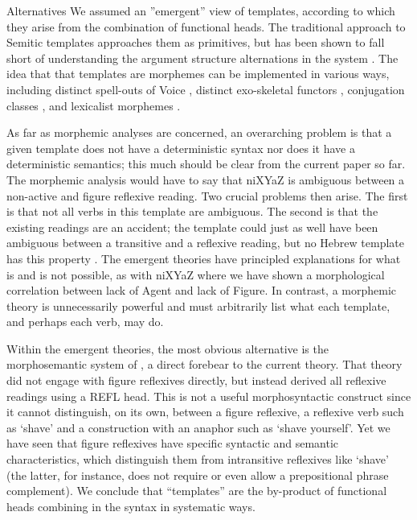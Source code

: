 Alternatives
We assumed an ''emergent'' view of templates, according to which they arise from the combination of functional heads. The traditional approach to Semitic templates approaches them as primitives, but has been shown to fall short of understanding the argument structure alternations in the system \citep{doron03,kastner16phd,kastner17gjgl,kastner18}. The idea that that templates are morphemes can be implemented in various ways, including distinct spell-outs of Voice \citep{arad05}, distinct exo-skeletal functors \citep{borer13oup}, conjugation classes \citep{aronoff07}, and lexicalist morphemes \citep{reinhartsiloni05,laks11,laks14}.

As far as morphemic analyses are concerned, an overarching problem is that a given template does not have a deterministic syntax nor does it have a deterministic semantics; this much should be clear from the current paper so far. The morphemic analysis would have to say that niXYaZ is ambiguous between a non-active and figure reflexive reading. Two crucial problems then arise. The first is that not all verbs in this template are ambiguous. The second is that the existing readings are an accident; the template could just as well have been ambiguous between a transitive and a reflexive reading, but no Hebrew template has this property \citep{doron05,kastner16phd}. The emergent theories have principled explanations for what is and is not possible, as with niXYaZ where we have shown a morphological correlation between lack of Agent and lack of Figure. In contrast, a morphemic theory is unnecessarily powerful and must arbitrarily list what each template, and perhaps each verb, may do.

Within the emergent theories, the most obvious alternative is the morphosemantic system of \cite{doron03}, a direct forebear to the current theory. That theory did not engage with figure reflexives directly, but instead derived all reflexive readings using a REFL head. This is not a useful morphosyntactic construct since it cannot distinguish, on its own, between a figure reflexive, a reflexive verb such as ‘shave’ and a construction with an anaphor such as ‘shave yourself’. Yet we have seen that figure reflexives have specific syntactic and semantic characteristics, which distinguish them from intransitive reflexives like ‘shave’ (the latter, for instance, does not require or even allow a prepositional phrase complement). We conclude that “templates” are the by-product of functional heads combining in the syntax in systematic ways.


